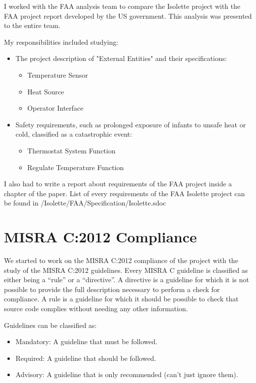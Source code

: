 \documentclass[a4paper, 12pt]{article}
\begin{document}
I worked with the FAA analysis team to compare the Isolette project with the FAA project report developed by the US government. This analysis was presented to the entire team.

My responsibilities included studying:

\begin{itemize}
    \item The project description of "External Entities" and their specifications:
    \begin{itemize}
        \item Temperature Sensor
        \item Heat Source
        \item Operator Interface
    \end{itemize}
    \item Safety requirements, such as prolonged exposure of infants to unsafe heat or cold, classified as a catastrophic event:
    \begin{itemize}
        \item Thermostat System Function
        \item Regulate Temperature Function
    \end{itemize}
\end{itemize}

I also had to write a report about requirements of the FAA project inside a chapter of the paper.
List of every requirements of the FAA Isolette project can be found in /Isolette/FAA/Specification/Isolette.sdoc

\section{MISRA C:2012 Compliance}

We started to work on the MISRA C:2012 compliance of the project with the study of the MISRA C:2012 guidelines.
Every MISRA C guideline is classified as either being a “rule” or a “directive”.
A directive is a guideline for which it is not possible to provide the full description necessary to perform a check for compliance.
A rule is a guideline for which it should be possible to check that source code complies without needing any other information.

Guidelines can be classified as:
\begin{itemize}
    \item Mandatory: A guideline that must be followed.
    \item Required: A guideline that should be followed.
    \item Advisory: A guideline that is only recommended (can't just ignore them).
\end{itemize}
\end{document}
